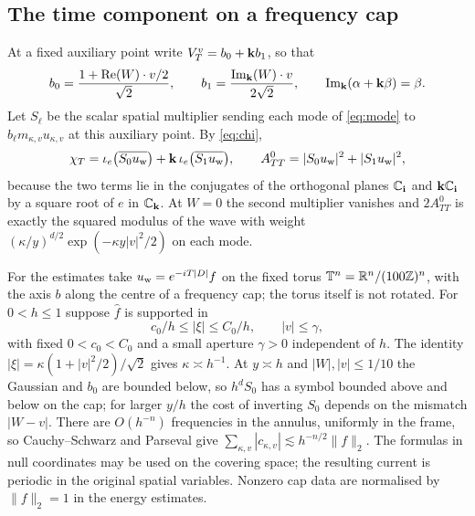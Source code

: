 \subsection{The time component on a frequency cap}\label{ssec:cap}
At a fixed auxiliary point write $V^v_T=b_0+\mathbf k b_1$, so that
\[
b_0=\frac{1+\operatorname{Re}(W)\cdot v/2}{\sqrt2},\qquad b_1=\frac{\operatorname{Im_{\mathbf k}}(W)\cdot v}{2\sqrt2},
\qquad\operatorname{Im_{\mathbf k}}(\alpha+\mathbf k\beta)=\beta .
\]
Let $S_\ell$ be the scalar spatial multiplier sending each mode of \eqref{eq:mode} to
$b_\ell m_{\kappa,v}u_{\kappa,v}$ at this auxiliary point. By \eqref{eq:chi},
\begin{equation}\label{eq:ATT}
\chi_T=\iota_e\bigl(\overline{S_0u_{\rm w}}\bigr)+\mathbf k\,\iota_e\bigl(\overline{S_1u_{\rm w}}\bigr),\qquad
A^0_{TT}=|S_0u_{\rm w}|^2+|S_1u_{\rm w}|^2 ,
\end{equation}
because the two terms lie in the conjugates of the orthogonal planes $\mathbb{C}_{\mathbf i}$ and $\mathbf k\mathbb{C}_{\mathbf i}$ by a
square root of $e$ in $\mathbb{C}_{\mathbf k}$. At $W=0$ the second multiplier vanishes and $2A^0_{TT}$ is exactly
the squared modulus of the wave with weight $(\kappa/y)^{d/2}\exp(-\kappa y|v|^2/2)$ on each mode.

For the estimates take $u_{\rm w}=e^{-iT|D|}f$ on the fixed torus $\mathbb{T}^n=\mathbb{R}^n/(100\mathbb{Z})^n$, with the
axis $b$ along the centre of a frequency cap; the torus itself is not rotated. For $0<h\le1$
suppose $\hat f$ is supported in
\[
c_0/h\le|\xi|\le C_0/h,\qquad|v|\le\gamma,
\]
with fixed $0<c_0<C_0$ and a small aperture $\gamma>0$ independent of $h$. The identity
$|\xi|=\kappa(1+|v|^2/2)/\sqrt2$ gives $\kappa\asymp h^{-1}$. At $y\asymp h$ and $|W|,|v|\le1/10$
the Gaussian and $b_0$ are bounded below, so $h^dS_0$ has a symbol bounded above and below on
the cap; for larger $y/h$ the cost of inverting $S_0$ depends on the mismatch $|W-v|$. There are
$O(h^{-n})$ frequencies in the annulus, uniformly in the frame, so Cauchy--Schwarz and Parseval
give $\sum_{\kappa,v}|c_{\kappa,v}|\lesssim h^{-n/2}\|f\|_2$. The formulas in null coordinates may
be used on the covering space; the resulting current is periodic in the original spatial
variables. Nonzero cap data are normalised by $\|f\|_2=1$ in the energy estimates.
